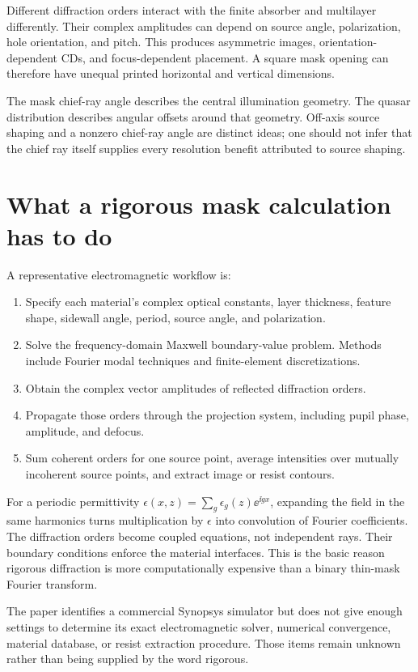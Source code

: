 Different diffraction orders interact with the finite absorber and
multilayer differently. Their complex amplitudes can depend on source
angle, polarization, hole orientation, and pitch. This produces
asymmetric images, orientation-dependent CDs, and focus-dependent
placement. A square mask opening can therefore have unequal printed
horizontal and vertical dimensions.

The mask chief-ray angle describes the central illumination geometry.
The quasar distribution describes angular offsets around that geometry.
Off-axis source shaping and a nonzero chief-ray angle are distinct ideas;
one should not infer that the chief ray itself supplies every resolution
benefit attributed to source shaping.

\section{What a rigorous mask calculation has to do}
A representative electromagnetic workflow is:
\begin{enumerate}
\item Specify each material's complex optical constants, layer thickness,
feature shape, sidewall angle, period, source angle, and polarization.
\item Solve the frequency-domain Maxwell boundary-value problem. Methods
include Fourier modal techniques and finite-element discretizations.
\item Obtain the complex vector amplitudes of reflected diffraction orders.
\item Propagate those orders through the projection system, including pupil
phase, amplitude, and defocus.
\item Sum coherent orders for one source point, average intensities over
mutually incoherent source points, and extract image or resist contours.
\end{enumerate}
For a periodic permittivity
$\epsilon(x,z)=\sum_g\epsilon_g(z)\ee^{\ii gx}$, expanding the field in
the same harmonics turns multiplication by $\epsilon$ into convolution
of Fourier coefficients. The diffraction orders become coupled equations,
not independent rays. Their boundary conditions enforce the material
interfaces. This is the basic reason rigorous diffraction is more
computationally expensive than a binary thin-mask Fourier transform.

The paper identifies a commercial Synopsys simulator but does not give
enough settings to determine its exact electromagnetic solver, numerical
convergence, material database, or resist extraction procedure.
Those items remain unknown rather than being supplied by the word rigorous.
